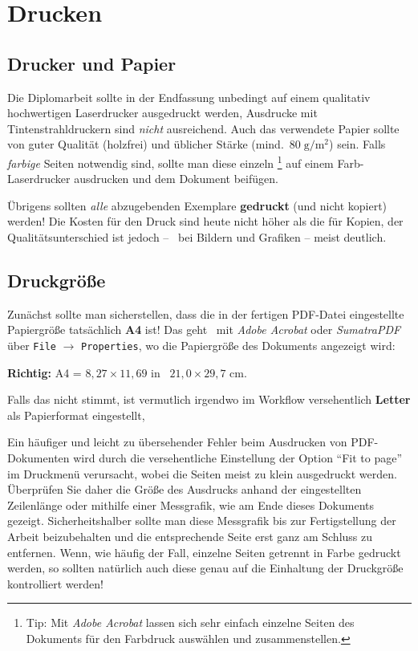 \section{Drucken}

\subsection{Drucker und Papier}

Die Diplomarbeit sollte in der Endfassung unbedingt auf einem
qualitativ hochwertigen Laserdrucker ausgedruckt werden, Ausdrucke
mit Tintenstrahldruckern sind \emph{nicht} ausreichend. Auch das
verwendete Papier sollte von guter Qualität (holzfrei) und
üblicher Stärke (mind.\ $80\; {\mathrm g} / {\mathrm m}^2$) sein.
Falls \emph{farbige} Seiten notwendig sind, sollte man diese einzeln%
\footnote{Tip: Mit \emph{Adobe Acrobat} lassen sich sehr einfach einzelne Seiten
des Dokuments für den Farbdruck auswählen und zusammenstellen.}
auf einem Farb-Laserdrucker ausdrucken und dem Dokument beifügen.

Übrigens sollten \emph{alle} abzugebenden Exemplare {\bf
gedruckt} (und nicht kopiert) werden! Die Kosten für den Druck
sind heute nicht höher als die für Kopien, der
Qualitätsunterschied ist jedoch -- \va\ bei Bildern und Grafiken
-- meist deutlich.


\subsection{Druckgröße}

Zunächst sollte man sicherstellen, dass die in der fertigen PDF-Datei eingestellte
Papiergröße tatsächlich \textbf{A4} ist! Das geht \zB\ mit \emph{Adobe Acrobat}
oder \emph{SumatraPDF}
über \texttt{File} $\rightarrow$ \texttt{Properties},
wo die Papiergröße des Dokuments angezeigt wird:
\begin{center}
\textbf{Richtig:} A4 = $8{,}27 \times 11{,}69$ in \bzw\ $21{,}0 \times 29{,}7$ cm.
\end{center}
Falls das nicht stimmt, ist vermutlich irgendwo im Workflow versehentlich \textbf{Letter} 
als Papierformat eingestellt, %


Ein häufiger und leicht zu übersehender Fehler beim Ausdrucken von
PDF-Dokumenten wird durch die versehentliche Einstellung der
Option "`Fit to page"' im Druckmenü verursacht, wobei die Seiten
meist zu klein ausgedruckt werden. Überprüfen Sie daher die Größe
des Ausdrucks anhand der eingestellten Zeilenlänge oder mithilfe
einer Messgrafik, wie am Ende dieses Dokuments gezeigt.
Sicherheitshalber sollte man diese Messgrafik bis zur
Fertigstellung der Arbeit beizubehalten und die entsprechende
Seite erst ganz am Schluss zu entfernen.
Wenn, wie häufig der Fall, einzelne Seiten getrennt in Farbe gedruckt 
werden, so sollten natürlich auch diese genau auf die Einhaltung der Druckgröße 
kontrolliert werden!




